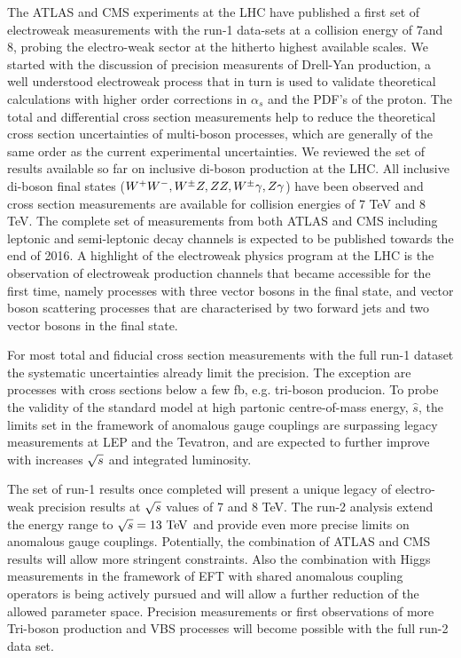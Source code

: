 The ATLAS and CMS experiments at the LHC have published a first set of electroweak measurements with the 
run-1 data-sets at a collision energy of 7\;\TeV and 8\;\TeV,
probing the electro-weak sector at the hitherto highest available scales.
We started with the discussion of precision measurents of Drell-Yan production, a well understood electroweak
process that in turn is used to validate theoretical calculations with higher order corrections in
$\alpha_s$ and the PDF's of the proton. The total and differential cross section measurements help to 
reduce the theoretical cross section uncertainties of multi-boson processes, which are generally of the same order as the current
experimental uncertainties.  
We reviewed the set of results available so far on inclusive di-boson production at the LHC. All inclusive di-boson final states
($W^+W^-,W^{\pm}Z,ZZ,W^{\pm}\gamma,Z\gamma$) have been observed and cross section measurements are available for collision energies of 7 TeV and 8 TeV. 
The complete set of measurements from both ATLAS and CMS including leptonic and semi-leptonic decay channels
is expected to be published towards the end of 2016.
A highlight of the electroweak physics program at the LHC is the observation of electroweak production channels 
that became accessible for the first time, namely processes with 
three vector bosons in the final state, and vector boson scattering processes that are 
characterised by two forward jets and two vector bosons in the final state.

For most total and fiducial cross section measurements with the full run-1 dataset the systematic uncertainties 
already limit the precision. The exception are processes with cross sections below a few fb, e.g. tri-boson producion. 
To probe the validity of the standard model at high partonic centre-of-mass energy, $\hat{s}$, the limits
set in the framework of anomalous gauge couplings are surpassing legacy measurements at LEP and the Tevatron,
and are expected to further improve with increases $\sqrt{s}$ and integrated luminosity. 

The set of run-1 results once completed will present a unique legacy of electro-weak precision results at 
$\sqrt{s}$ values of 7 and 8 TeV.
The run-2 analysis extend the energy range to $\rts=13\TeV$ 
and provide even more precise limits on anomalous gauge couplings. Potentially, 
the combination of ATLAS and CMS results will allow more stringent constraints. Also the combination
with Higgs measurements in the framework of EFT with shared anomalous coupling operators is being 
actively pursued and will allow a further reduction of the allowed parameter space. 
Precision measurements or first observations of more Tri-boson production and VBS processes will become possible with the full 
run-2 data set. 


 
